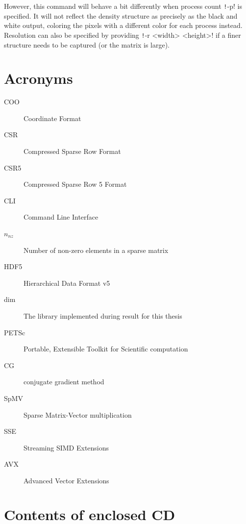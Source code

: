 \documentclass[thesis=M,english]{FITthesis}[2019/12/23]
\newcommand{\csre}[1]{\texttt!#1!}
\begin{document}
However, this command will behave a bit differently when process count \csre{-p} is specified. It will not
reflect the density structure as precisely as the black and white output, coloring the pixels
with a different color for each process instead. Resolution can also be specified by providing
\csre{-r <width> <height>} if a finer structure needs to be captured (or the matrix is large).



\chapter{Acronyms}
\begin{description}
    \item[COO] Coordinate Format
    \item[CSR] Compressed Sparse Row Format
    \item[CSR5] Compressed Sparse Row 5 Format
    \item[CLI] Command Line Interface
    \item[$n_{nz}$] Number of non-zero elements in a sparse matrix
    \item[HDF5] Hierarchical Data Format v5
    \item[dim]  The library implemented during result for this thesis
    \item[PETSc] Portable, Extensible Toolkit for Scientific computation
    \item[CG] conjugate gradient method
    \item[SpMV] Sparse Matrix-Vector multiplication
    \item[SSE] Streaming SIMD Extensions
    \item[AVX] Advanced Vector Extensions
\end{description}


\chapter{Contents of enclosed CD}

\end{document}

